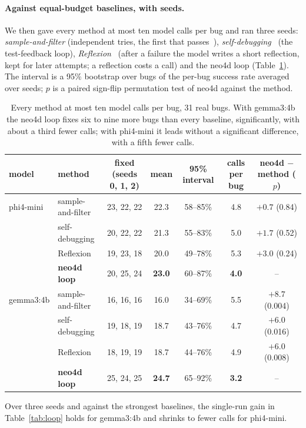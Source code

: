 \documentclass[10pt]{article}
\begin{document}
\paragraph{Against equal-budget baselines, with seeds.} We then gave every method at most ten model calls per bug
and ran three seeds: \emph{sample-and-filter} (independent tries, the first that passes~\cite{alphacode}),
\emph{self-debugging}~\cite{chen2024} (the test-feedback loop), \emph{Reflexion}~\cite{reflexion} (after a failure
the model writes a short reflection, kept for later attempts; a reflection costs a call) and the neo4d loop
(Table~\ref{tab:baselines}). The interval is a 95\% bootstrap over bugs of the per-bug success rate averaged over
seeds; $p$ is a paired sign-flip permutation test of neo4d against the method.
\begin{table}[H]
\centering\small
\setlength{\tabcolsep}{4pt}
\begin{tabular}{llccccc}
\toprule
model & method & fixed (seeds 0, 1, 2) & mean & 95\% interval & calls per bug & neo4d $-$ method ($p$)\\
\midrule
phi4-mini & sample-and-filter & 23, 22, 22 & 22.3 & 58--85\% & 4.8 & $+0.7$ (0.84)\\
 & self-debugging & 20, 22, 22 & 21.3 & 55--83\% & 5.0 & $+1.7$ (0.52)\\
 & Reflexion & 19, 23, 18 & 20.0 & 49--78\% & 5.3 & $+3.0$ (0.24)\\
 & \textbf{neo4d loop} & 20, 25, 24 & \textbf{23.0} & 60--87\% & \textbf{4.0} & --\\
\midrule
gemma3:4b & sample-and-filter & 16, 16, 16 & 16.0 & 34--69\% & 5.5 & $+8.7$ (0.004)\\
 & self-debugging & 19, 18, 19 & 18.7 & 43--76\% & 4.7 & $+6.0$ (0.016)\\
 & Reflexion & 18, 19, 19 & 18.7 & 44--76\% & 4.9 & $+6.0$ (0.008)\\
 & \textbf{neo4d loop} & 25, 24, 25 & \textbf{24.7} & 65--92\% & \textbf{3.2} & --\\
\bottomrule
\end{tabular}
\caption{Every method at most ten model calls per bug, 31 real bugs. With gemma3:4b the neo4d loop fixes six to nine
more bugs than every baseline, significantly, with about a third fewer calls; with phi4-mini it leads without a
significant difference, with a fifth fewer calls.}
\label{tab:baselines}
\end{table}
Over three seeds and against the strongest baselines, the single-run gain in Table~\ref{tab:loop} holds for gemma3:4b
and shrinks to fewer calls for phi4-mini.
\end{document}
